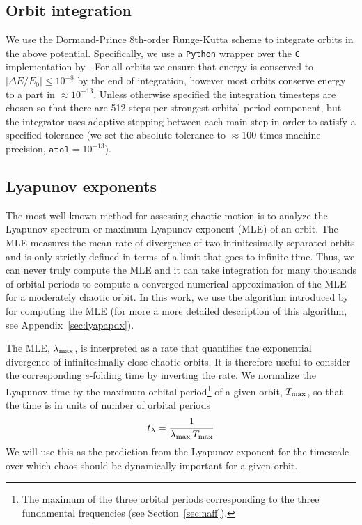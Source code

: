 \documentclass[letterpaper,12pt,preprint]{aastex}
\begin{document}
\subsection{Orbit integration}\label{sec:integration}

We use the Dormand-Prince 8th-order Runge-Kutta scheme \citep{prince81} to integrate orbits in the above potential. Specifically, we use a \texttt{Python} wrapper over the \texttt{C} implementation by \cite{hairer93}. For all orbits we ensure that energy is conserved to $|\Delta E/E_0| \leq 10^{-8}$ by the end of integration, however most orbits conserve energy to a part in $\approx$$10^{-13}$. Unless otherwise specified the integration timesteps are chosen so that there are 512 steps per strongest orbital period component, but the integrator uses adaptive stepping between each main step in order to satisfy a specified tolerance (we set the absolute tolerance to $\approx$100 times machine precision, $\texttt{atol} = 10^{-13}$). 

\subsection{Lyapunov exponents} \label{sec:lyap}

The most well-known method for assessing chaotic motion is to analyze the Lyapunov spectrum or maximum Lyapunov exponent (MLE) of an orbit. The MLE measures the mean rate of divergence of two infinitesimally separated orbits and is only strictly defined in terms of a limit that goes to infinite time. Thus, we can never truly compute the MLE and it can take integration for many thousands of orbital periods to compute a converged numerical approximation of the MLE for a moderately chaotic orbit. In this work, we use the algorithm introduced by \cite{wolf85} for computing the MLE (for more a more detailed description of this algorithm, see Appendix~\ref{sec:lyapapdx}).

The MLE, $\lambda_{\rm max}$, is interpreted as a rate that quantifies the exponential divergence of infinitesimally close chaotic orbits. It is therefore useful to consider the corresponding $e$-folding time by inverting the rate. We normalize the Lyapunov time by the maximum orbital period\footnote{The maximum of the three orbital periods corresponding to the three fundamental frequencies (see Section~\ref{sec:naff}).} of a given orbit, $T_{\rm max}$, so that the time is in units of number of orbital periods
\begin{equation}
	t_{\rm \lambda} = \frac{1}{\lambda_{\rm max} \, T_{\rm max}}
\end{equation}
We will use this as the prediction from the Lyapunov exponent for the timescale over which chaos should be dynamically important for a given orbit. 
\end{document}
